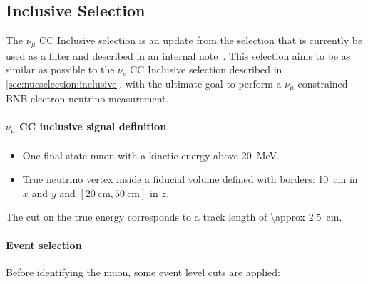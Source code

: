 \subsection{Inclusive Selection}
\label{ssec:NuMUCCsel:INC}
The $\nu_\mu$ CC Inclusive selection is an update from the selection that is currently be used as a filter and described in an internal note~\cite{bib:numuccfilter}. This selection aims to be as similar as possible to the $\nu_e$ CC Inclusive selection described in \cref{sec:nueselection:inclusive}, with the ultimate goal to perform a $\nu_\mu$ constrained BNB electron neutrino measurement. 

\paragraph{$\nu_\mu$ CC inclusive signal definition}
\begin{itemize}
    \item One final state muon with a kinetic energy above \SI{20}{\MeV}.
    \item True neutrino vertex inside a fiducial volume defined with borders: \SI{10}{\cm} in $x$ and $y$ and $[ \SI{20}{\cm}, \SI{50}{\cm}]$ in $z$.
\end{itemize}
The cut on the true energy corresponds to a track length of \SI{\approx 2.5}{\cm}.

\paragraph{Event selection}
Before identifying the muon, some event level cuts are applied:

